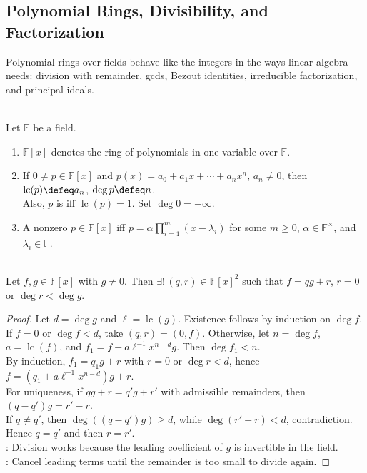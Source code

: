 \subsection{Polynomial Rings, Divisibility, and Factorization}

Polynomial rings over fields behave like the integers in the ways linear algebra needs: division with remainder, gcds, Bezout identities, irreducible factorization, and principal ideals.

\begin{definition} \label{def:polynomial-degree-monic-splitting} \\
Let $\mathbb{F}$ be a field.
\begin{enumerate}[label=(\roman*)]
\setlength{\itemsep}{0pt}
\item $\mathbb{F}[x]$ denotes the ring of polynomials in one variable over $\mathbb{F}$.
\item If $0\neq p\in\mathbb{F}[x]$ and $p(x)=a_0+a_1x+\cdots+a_nx^n$, $a_n\neq0$, then $\operatorname{lc}(p)\defeq a_n$, $\deg p\defeq n$.\\
Also, $p$ is  iff $\operatorname{lc}(p)=1$. Set $\deg0=-\infty$.
\item A nonzero $p\in\mathbb{F}[x]$  iff $p=\alpha\prod\limits_{i=1}^{m}(x-\lambda_i)$ for some $m\geq0$, $\alpha\in\mathbb{F}^{\times}$, and $\lambda_i\in\mathbb{F}$.
\end{enumerate}
\end{definition}

\begin{theorem} \label{thm:polynomial-division-algorithm} \\
Let $f,g\in\mathbb{F}[x]$ with $g\neq0$. Then $\exists!\,(q,r)\in\mathbb{F}[x]^2$ such that  $f=qg+r$, $r=0$ or $\deg r<\deg g$.
\begin{proof}
Let $d=\deg g$ and $\ell=\operatorname{lc}(g)$. Existence follows by induction on $\deg f$. If $f=0$ or $\deg f<d$, take $(q,r)=(0,f)$. Otherwise, let $n=\deg f$, $a=\operatorname{lc}(f)$, and $f_1=f-a\ell^{-1}x^{n-d}g$. Then $\deg f_1<n$.\\
By induction, $f_1=q_1g+r$ with $r=0$ or $\deg r<d$, hence $f=(q_1+a\ell^{-1}x^{n-d})g+r$.\\
For uniqueness, if $qg+r=q'g+r'$ with admissible remainders, then $(q-q')g=r'-r$.\\
If $q\neq q'$, then $\deg((q-q')g)\geq d$, while $\deg(r'-r)<d$, contradiction. Hence $q=q'$ and then $r=r'$.\\
: Division works because the leading coefficient of $g$ is invertible in the field.\\
: Cancel leading terms until the remainder is too small to divide again.
\end{proof}
\end{theorem}

